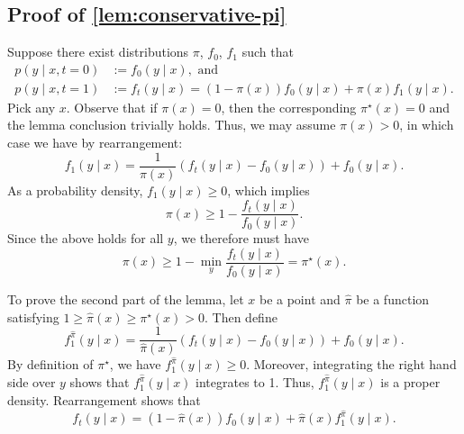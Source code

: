 \subsection{Proof of \cref{lem:conservative-pi}}
Suppose there exist distributions $\pi$, $f_0$, $f_1$ such that
\begin{align*}
p(y \mid x, t=0) &:= f_0(y \mid x), \text{ and } \\
p(y \mid x, t=1) &:= f_t(y \mid x) = (1-\pi(x)) f_0(y \mid x) + \pi(x) f_1(y \mid x).
\end{align*}
Pick any $x$. Observe that if $\pi(x)=0$, then the corresponding $\pi^\star(x) = 0$ and the lemma conclusion trivially holds. Thus, we may assume $\pi(x) > 0$, in which case we have by rearrangement:
\[ f_1(y \mid x) = \frac{1}{\pi(x)} \left( f_t(y \mid x) - f_0(y \mid x) \right) + f_0(y \mid x). \]
As a probability density, $f_1(y \mid x) \geq 0$, which implies
\[  \pi(x) \geq 1 - \frac{f_t(y \mid x)}{f_0(y \mid x)}. \]
Since the above holds for all $y$, we therefore must have 
\[  \pi(x) \geq 1 - \min_y \frac{f_t(y \mid x)}{f_0(y \mid x)} = \pi^\star(x). \]


To prove the second part of the lemma, let $x$ be a point and $\hat{\pi}$ be a function satisfying $1 \geq \hat{\pi}(x) \geq \pi^\star(x) > 0$. Then define
\[ f_1^{\hat{\pi}}(y \mid x) = \frac{1}{\hat{\pi}(x)} \left( f_t(y \mid x) - f_0(y \mid x) \right) + f_0(y \mid x). \]
By definition of $\pi^\star$, we have $f_1^{\hat{\pi}}(y \mid x) \geq 0$. Moreover, integrating the right hand side over $y$ shows that $f_1^{\hat{\pi}}(y \mid x)$ integrates to 1. Thus, $f_1^{\hat{\pi}}(y \mid x)$ is a proper density. Rearrangement shows that
\[ f_t(y \mid x) = (1-\hat{\pi}(x)) f_0(y \mid x) + \hat{\pi}(x) f_1^{\hat{\pi}}(y \mid x). \]
